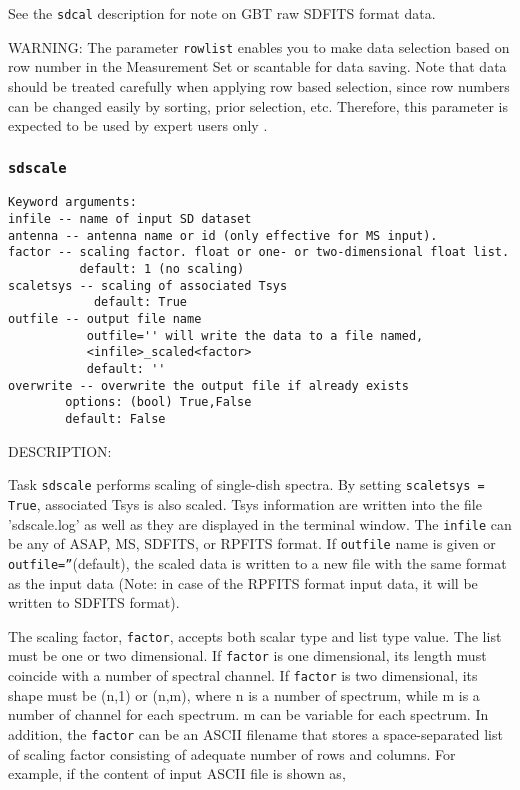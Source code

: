 See the {\tt sdcal} description for note on GBT raw SDFITS format data.

WARNING:  The parameter {\tt rowlist} enables you to make data selection based
on row number in the Measurement Set or scantable for data saving. 
Note that data should be treated carefully when applying row
based selection, since row numbers can be changed easily by
sorting, prior selection, etc. Therefore, this parameter is expected
to be used by expert users only . 





\subsubsection{{\tt sdscale}}
\label{section:sd.sdtasks.tasks.sdscale}

\begin{verbatim}
Keyword arguments:
infile -- name of input SD dataset
antenna -- antenna name or id (only effective for MS input). 
factor -- scaling factor. float or one- or two-dimensional float list.
          default: 1 (no scaling)
scaletsys -- scaling of associated Tsys
            default: True
outfile -- output file name 
           outfile='' will write the data to a file named,
           <infile>_scaled<factor>
           default: ''
overwrite -- overwrite the output file if already exists
        options: (bool) True,False
        default: False
\end{verbatim}

DESCRIPTION:

Task {\tt sdscale} performs scaling of single-dish spectra.
By setting {\tt scaletsys = True}, associated Tsys is also scaled.
Tsys information are written into the file 'sdscale.log'
as well as they are displayed in the terminal window.
The {\tt infile} can be any of ASAP, MS, SDFITS, or RPFITS format.
If {\tt outfile} name is given or {\tt outfile=''}(default), the scaled data is written
to a new file with the same format as the input data (Note: in case of the
RPFITS format input data, it will be written to SDFITS format).
    
The scaling factor, {\tt factor}, accepts both scalar type and list type
value. The list must be one or two dimensional. If {\tt factor} is one
dimensional, its length must coincide with a number of spectral
channel. If {\tt factor} is two dimensional, its shape must be (n,1) or
(n,m), where n is a number of spectrum, while m is a number of channel
for each spectrum. m can be variable for each spectrum. In addition,
the {\tt factor} can be an ASCII filename that stores a space-separated list
of scaling factor consisting of adequate number of rows and columns.
For example, if the content of input ASCII file is shown as,

